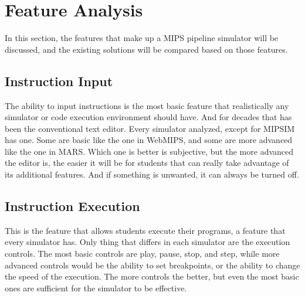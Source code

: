 \section{Feature Analysis}\label{sec:feature_comparison}

In this section, the features that make up a MIPS pipeline simulator will be discussed, and the existing solutions will be compared based on those features.

\subsection{Instruction Input}\label{sec:instruction_input}
The ability to input instructions is the most basic feature that realistically any simulator or code execution environment should have. And for decades that has been the conventional text editor. Every simulator analyzed, except for MIPSIM has one. Some are basic like the one in WebMIPS, and some are more advanced like the one in MARS. Which one is better is subjective, but the more advanced the editor is, the easier it will be for students that can really take advantage of its additional features. And if something is unwanted, it can always be turned off.

\subsection{Instruction Execution}\label{sec:instruction_execution}
This is the feature that allows students execute their programs, a feature that every simulator has. Only thing that differs in each simulator are the execution controls. The most basic controls are play, pause, stop, and step, while more advanced controls would be the ability to set breakpoints, or the ability to change the speed of the execution. The more controls the better, but even the most basic ones are sufficient for the simulator to be effective.

